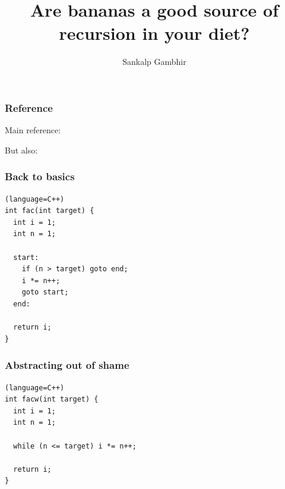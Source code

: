 \documentclass[
  aspectratio=1610, 
  xcolor={dvipsnames},
]{beamer}
\title{Are bananas a good source of recursion in your diet?}
\author{Sankalp Gambhir}
\begin{document}
\maketitle

\begin{frame}
  \frametitle{Reference}

  Main reference: 


  But also:




\end{frame}

\begin{frame}[fragile]
  \frametitle{Back to basics}

  \begin{lstlisting}(language=C++)
int fac(int target) {
  int i = 1;
  int n = 1;
  
  start:
    if (n > target) goto end;
    i *= n++;
    goto start;
  end:
  
  return i;
}
  \end{lstlisting}



\end{frame}

\begin{frame}[fragile]
  \frametitle{Abstracting out of shame}

  \begin{lstlisting}(language=C++)
int facw(int target) {
  int i = 1;
  int n = 1;
  
  while (n <= target) i *= n++;
  
  return i;
}
  \end{lstlisting}  


\end{frame}
\end{document}
